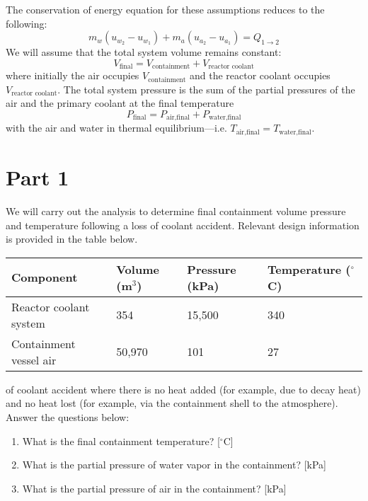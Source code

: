 \begin{fullwidth}
The conservation of energy equation for these assumptions reduces to the following:
$$m_w\left(u_{w_2} - u_{w_1}\right) + m_a\left(u_{a_2} - u_{a_1} \right) = Q_{1 \rightarrow 2} $$
We will assume that the total system volume remains constant:
$$V_{\text{final}} = V_{\text{containment}} + V_{\text{reactor coolant}}$$
where initially the air occupies $V_{\text{containment}}$ and the reactor coolant occupies $V_{\text{reactor coolant}}$.  The total system pressure is the sum of the partial pressures of the air and the primary coolant at the final temperature
$$P_{\text{final}} = P_{\text{air,final}} + P_{\text{water,final}}$$
with the air and water in thermal equilibrium---i.e. $T_{\text{air,final}} = T_{\text{water,final}}$.

\section{Part 1}

We will carry out the analysis to determine final containment volume pressure and temperature following a loss of coolant accident.  Relevant design information is provided in the table below.

\begin{table}
\begin{tabular}{l | l | l | l}
\toprule
\textbf{Component} & \textbf{Volume (m$^3$)} & \textbf{Pressure (kPa)} & \textbf{Temperature ($^{\circ}$C)} \\
\hline
Reactor coolant system & 354 & 15,500 & 340 \\
\hline
Containment vessel air & 50,970 & 101 & 27 \\
\bottomrule
\end{tabular}
\end{table}

 of coolant accident where there is no heat added (for example, due to decay heat) and no heat lost (for example, via the containment shell to the atmosphere).  Answer the questions below:

\begin{enumerate}
\item What is the final containment temperature? [$^{\circ}$C]
\vspace{1.0 cm}
\item What is the partial pressure of water vapor in the containment? [kPa]
\vspace{1.0 cm}
\item What is the partial pressure of air in the containment? [kPa]
\end{enumerate}


\end{fullwidth}
